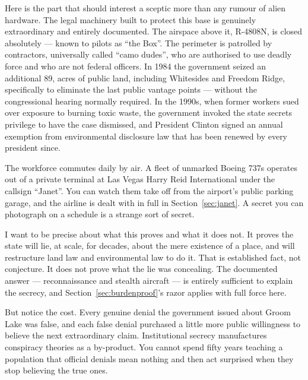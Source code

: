 Here is the part that should interest a sceptic more than any rumour of alien hardware.
The legal machinery built to protect this base is genuinely extraordinary and entirely
documented. The airspace above it, R-4808N, is closed absolutely --- known to pilots as
``the Box''. The perimeter is patrolled by contractors, universally called ``camo
dudes'', who are authorised to use deadly force and who are not federal officers. In 1984
the government seized an additional 89, acres of public land, including Whitesides
and Freedom Ridge, specifically to eliminate the last public vantage points --- without
the congressional hearing normally required. In the 1990s, when former workers sued over
exposure to burning toxic waste, the government invoked the state secrets privilege to
have the case dismissed, and President Clinton signed an annual exemption from
environmental disclosure law that has been renewed by every president since.

\begin{funfact}
The workforce commutes daily by air. A fleet of unmarked Boeing 737s operates out of a
private terminal at Las Vegas Harry Reid International under the callsign ``Janet''. You
can watch them take off from the airport's public parking garage, and the airline is dealt
with in full in Section~\ref{sec:janet}. A secret you can photograph on a schedule is a
strange sort of secret.
\end{funfact}

I want to be precise about what this proves and what it does not. It proves the state
will lie, at scale, for decades, about the mere existence of a place, and will restructure
land law and environmental law to do it. That is established fact, not conjecture. It does
not prove what the lie was concealing. The documented answer --- reconnaissance and
stealth aircraft --- is entirely sufficient to explain the secrecy, and Section~\ref{sec:burdenproof}'s
razor applies with full force here.

But notice the cost. Every genuine denial the government issued about Groom Lake was
false, and each false denial purchased a little more public willingness to believe the
next extraordinary claim. Institutional secrecy manufactures conspiracy theories as a
by-product. You cannot spend fifty years teaching a population that official denials mean
nothing and then act surprised when they stop believing the true ones.

